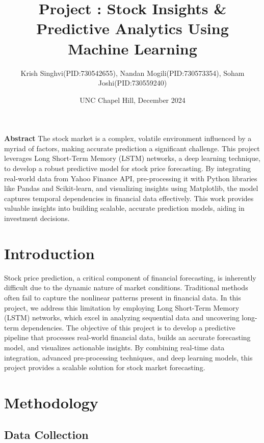 \documentclass{article}
\title{\textbf{Project : Stock Insights \& Predictive Analytics Using Machine
Learning}}
\author{\normalsize Krish Singhvi(PID:730542655), Nandan Mogili(PID:730573354), Soham Joshi(PID:730559240)}
\date{UNC Chapel Hill, December 2024}
\begin{document}
\maketitle


\textbf{\Large Abstract}
\newline
The stock market is a complex, volatile environment influenced by a myriad of factors, making accurate prediction a significant challenge. This project leverages Long Short-Term Memory (LSTM) networks, a deep learning technique, to develop a robust predictive model for stock price forecasting. By integrating real-world data from Yahoo Finance API, pre-processing it with Python libraries like Pandas and Scikit-learn, and visualizing insights using Matplotlib, the model captures temporal dependencies in financial data effectively. This work provides valuable insights into building scalable, accurate prediction models, aiding in investment decisions.



\section{Introduction}
Stock price prediction, a critical component of financial forecasting, is inherently difficult due to the dynamic nature of market conditions. Traditional methods often fail to capture the nonlinear patterns present in financial data. In this project, we address this limitation by employing Long Short-Term Memory (LSTM) networks, which excel in analyzing sequential data and uncovering long-term dependencies.
\newline \newline 
The objective of this project is to develop a predictive pipeline that processes real-world financial data, builds an accurate forecasting model, and visualizes actionable insights. By combining real-time data integration, advanced pre-processing techniques, and deep learning models, this project provides a scalable solution for stock market forecasting.


\section{Methodology}
\vspace{10pt}
\setlength{\marginparwidth}{0pt}
\setlength{\marginparsep}{0pt}
\subsection{Data Collection}
\end{document}
